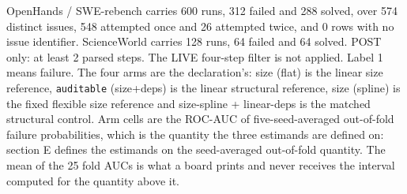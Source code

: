 OpenHands / SWE-rebench carries 600 runs, 312 failed and 288 solved, over 574 distinct issues, 548 attempted once and 26 attempted twice, and 0 rows with no issue identifier.
ScienceWorld carries 128 runs, 64 failed and 64 solved.
POST only: at least 2 parsed steps. The LIVE four-step filter is not applied. Label 1 means failure.
The four arms are the declaration's: size (flat) is the linear size reference, \texttt{auditable} (size+deps) is the linear structural reference, size (spline) is the fixed flexible size reference and size-spline + linear-deps is the matched structural control.
Arm cells are the ROC-AUC of five-seed-averaged out-of-fold failure probabilities, which is the quantity the three estimands are defined on: section E defines the estimands on the seed-averaged out-of-fold quantity. The mean of the 25 fold AUCs is what a board prints and never receives the interval computed for the quantity above it.
